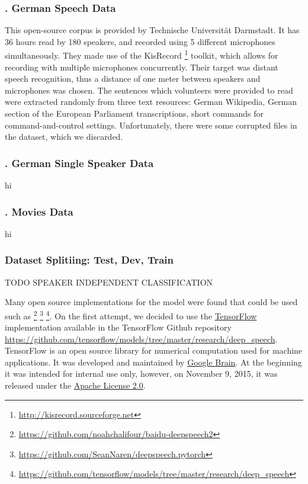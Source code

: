 \subsubsection{. German Speech Data \cite{radeck2015open}}
\label{meth:subsub3}

This open-source corpus is provided by Technische Universit{\"a}t Darmstadt. It has 36 hours read by 180 speakers, and recorded using 5 different microphones simultaneously. They made use of the KisRecord \footnote{\url{http://kisrecord.sourceforge.net}} toolkit, which allows for recording with multiple microphones concurrently. Their target was distant speech recognition, thus a distance of one meter between speakers and microphones was chosen. The sentences which volunteers were provided to read were extracted randomly from three text resources: German Wikipedia, German section of the European Parliament transcriptions, short commands for command-and-control settings. Unfortunately, there were some corrupted files in the dataset, which we discarded.

\subsubsection{. German Single Speaker Data}
\label{meth:subsub6}
hi

\subsubsection{. Movies Data}
\label{meth:subsub7}
hi

\subsubsection{Dataset Splitiing: Test, Dev, Train}
\label{meth:subsub7}
TODO SPEAKER INDEPENDENT CLASSIFICATION


Many open source implementations for the model were found that could be used such as \footnote{\url{https://github.com/noahchalifour/baidu-deepspeech2}} \footnote{\url{https://github.com/SeanNaren/deepspeech.pytorch}} \footnote{\url{https://github.com/tensorflow/models/tree/master/research/deep_speech}}. On the first attempt, we decided to use the \href{https://www.tensorflow.org/}{TensorFlow} \cite{tensorflow2015-whitepaper} implementation available in the TensorFlow Github repository \url{https://github.com/tensorflow/models/tree/master/research/deep_speech}. TensorFlow is an open source library for numerical computation used for machine applications. It was developed and maintained by \href{https://ai.google/research/teams/brain}{Google Brain}. At the beginning it was intended for internal use only, however, on  November 9, 2015, it was released under the \href{http://www.apache.org/licenses/LICENSE-2.0}{Apache License 2.0}.

